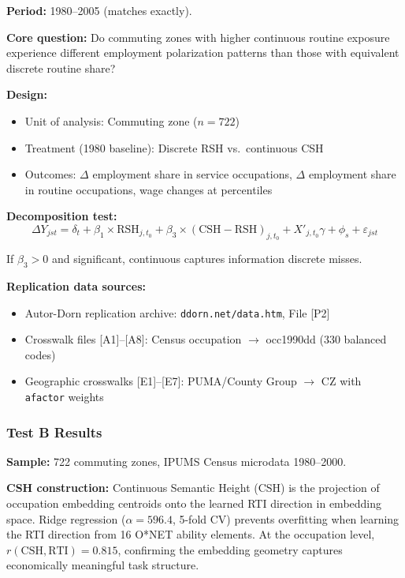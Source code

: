 \documentclass[12pt]{article}
\begin{document}
\textbf{Period:} 1980--2005 (matches \citet{AutorDorn2013} exactly).

\textbf{Core question:} Do commuting zones with higher continuous routine exposure experience different employment polarization patterns than those with equivalent discrete routine share?

\textbf{Design:}
\begin{itemize}
    \item Unit of analysis: Commuting zone ($n = 722$)
    \item Treatment (1980 baseline): Discrete RSH vs.\ continuous CSH
    \item Outcomes: $\Delta$ employment share in service occupations, $\Delta$ employment share in routine occupations, wage changes at percentiles
\end{itemize}

\textbf{Decomposition test:}
\begin{equation}
\Delta Y_{jst} = \delta_t + \beta_1 \times \text{RSH}_{j,t_0} + \beta_3 \times (\text{CSH} - \text{RSH})_{j,t_0} + X'_{j,t_0} \gamma + \phi_s + \varepsilon_{jst}
\end{equation}

If $\beta_3 > 0$ and significant, continuous captures information discrete misses.

\textbf{Replication data sources:}
\begin{itemize}
    \item Autor-Dorn replication archive: \texttt{ddorn.net/data.htm}, File [P2]
    \item Crosswalk files [A1]--[A8]: Census occupation $\to$ occ1990dd (330 balanced codes)
    \item Geographic crosswalks [E1]--[E7]: PUMA/County Group $\to$ CZ with \texttt{afactor} weights
\end{itemize}


\subsubsection{Test B Results}
\label{app:test-b-results}


\textbf{Sample:} 722 commuting zones, IPUMS Census microdata 1980--2000.

\textbf{CSH construction:} Continuous Semantic Height (CSH) is the projection of occupation embedding centroids onto the learned RTI direction in embedding space. Ridge regression ($\alpha = 596.4$, 5-fold CV) prevents overfitting when learning the RTI direction from 16 O*NET ability elements. At the occupation level, $r(\text{CSH}, \text{RTI}) = 0.815$, confirming the embedding geometry captures economically meaningful task structure.
\end{document}
